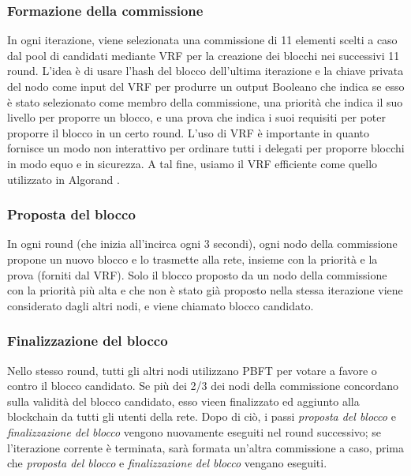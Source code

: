 \subsubsection{Formazione della commissione}
In ogni iterazione, viene selezionata una commissione di 11 elementi scelti a caso dal pool di candidati mediante VRF per la creazione dei blocchi nei successivi 11 round. L'idea è di usare l'hash del blocco dell'ultima iterazione e la chiave privata del nodo come input del VRF per produrre un output Booleano che indica se esso è stato selezionato come membro della commissione, una priorità che indica il suo livello per proporre un blocco, e una prova che indica i suoi requisiti per poter proporre il blocco in un certo round. L'uso di VRF è importante in quanto fornisce un modo non interattivo per ordinare tutti i delegati per proporre blocchi in modo equo e in sicurezza. A tal fine, usiamo il VRF efficiente come quello utilizzato in Algorand \cite{c12}.

\subsubsection{Proposta del blocco}
In ogni round (che inizia all'incirca ogni 3 secondi), ogni nodo della commissione propone un nuovo blocco e lo trasmette alla rete, insieme con la priorità e la prova (forniti dal VRF). Solo il blocco proposto da un nodo della commissione con la priorità più alta e che non è stato già proposto nella stessa iterazione viene considerato dagli altri nodi, e viene chiamato blocco candidato.

\subsubsection{Finalizzazione del blocco}
Nello stesso round, tutti gli altri nodi utilizzano PBFT per votare a favore o contro il blocco candidato. Se più dei 2/3 dei nodi della commissione concordano sulla validità del blocco candidato, esso vieen finalizzato ed aggiunto alla blockchain da tutti gli utenti della rete. Dopo di ciò, i passi \emph{proposta del blocco} e \emph{finalizzazione del blocco} vengono nuovamente eseguiti nel round successivo; se l'iterazione corrente è terminata, sarà formata un'altra commissione a caso, prima che \emph{proposta del blocco} e \emph{finalizzazione del blocco} vengano eseguiti.

